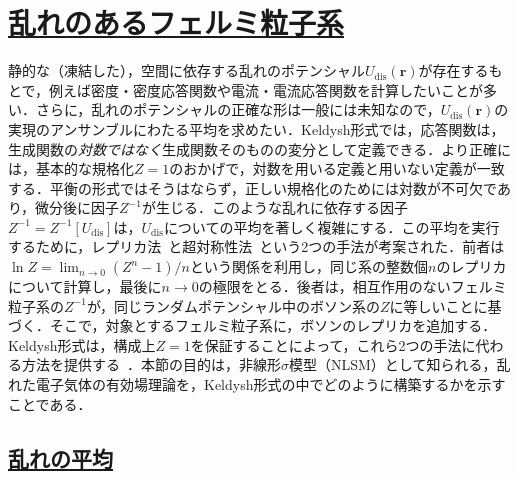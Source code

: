 \documentclass[a4paper,11pt]{ltjsarticle}
\newcommand{\sectionlink}[1]{\section[#1]{\hyperlink{toc}{#1}}}
\newcommand{\subsectionlink}[1]{\subsection[#1]{\hyperlink{toc}{#1}}}
\begin{document}

\sectionlink{乱れのあるフェルミ粒子系}\label{sec_NLSM}



静的な（凍結した），空間に依存する乱れのポテンシャル$U_{\mathrm{dis}}(\mathbf{r})$が存在するもとで，例えば密度・密度応答関数や電流・電流応答関数を計算したいことが多い．さらに，乱れのポテンシャルの正確な形は一般には未知なので，$U_{\mathrm{dis}}(\mathbf{r})$の実現のアンサンブルにわたる平均を求めたい．Keldysh形式では，応答関数は，生成関数の{\em 対数ではなく}生成関数そのものの変分として定義できる．より正確には，基本的な規格化$Z=1$のおかげで，対数を用いる定義と用いない定義が一致する．平衡の形式ではそうはならず，正しい規格化のためには対数が不可欠であり，微分後に因子$Z^{-1}$が生じる．このような乱れに依存する因子$Z^{-1}=Z^{-1}[U_{\mathrm{dis}}]$は，$U_{\mathrm{dis}}$についての平均を著しく複雑にする．この平均を実行するために，レプリカ法~\cite{Edwards,Wegner,EfetovLarkinKhmelnitskii,Finkel'stein,BelitzKirkpatrick}と超対称性法~\cite{Efetov,Efetov-book}という2つの手法が考案された．前者は$\ln Z=\lim_{n\to 0}(Z^n-1)/n$という関係を利用し，同じ系の整数個$n$のレプリカについて計算し，最後に$n\to 0$の極限をとる．後者は，相互作用のないフェルミ粒子系の$Z^{-1}$が，同じランダムポテンシャル中のボソン系の$Z$に等しいことに基づく．そこで，対象とするフェルミ粒子系に，ボソンのレプリカを追加する．Keldysh形式は，構成上$Z=1$を保証することによって，これら2つの手法に代わる方法を提供する~\cite{HorbachSchon,KamenevAndreev,ChamonLudwigNayak}．本節の目的は，非線形$\sigma$模型（NLSM）として知られる，乱れた電子気体の有効場理論を，Keldysh形式の中でどのように構築するかを示すことである．



\subsectionlink{乱れの平均}\label{sec_NLSM-1}
\end{document}
